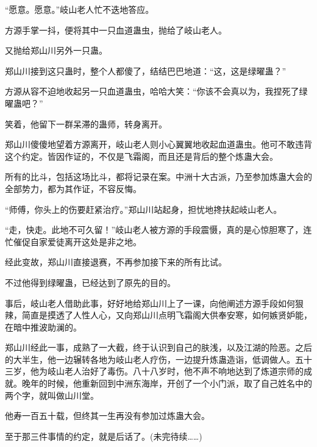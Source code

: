 \begin{this_body}
“愿意。愿意。”岐山老人忙不迭地答应。

方源手掌一抖，便将其中一只血道蛊虫，抛给了岐山老人。

又抛给郑山川另外一只蛊。

郑山川接到这只蛊时，整个人都傻了，结结巴巴地道：“这，这是绿曜蛊？”

方源从容不迫地收起另一只血道蛊虫，哈哈大笑：“你该不会真以为，我捏死了绿曜蛊吧？”

笑着，他留下一群呆滞的蛊师，转身离开。

郑山川傻傻地望着方源离开，岐山老人则小心翼翼地收起血道蛊虫。他可不敢违背这个约定。皆因作证的，不仅是飞霜阁，而且还是背后的整个炼蛊大会。

所有的比斗，包括这场比斗，都将记录在案。中洲十大古派，乃至参加炼蛊大会的全部势力，都为其作证，不容反悔。

“师傅，你头上的伤要赶紧治疗。”郑山川站起身，担忧地搀扶起岐山老人。

“走，快走。此地不可久留！”岐山老人被方源的手段震慑，真的是心惊胆寒了，连忙催促自家爱徒离开这处是非之地。

经此变故，郑山川直接退赛，不再参加接下来的所有比试。

不过他得到绿曜蛊，已经达到了原先的目的。

事后，岐山老人借助此事，好好地给郑山川上了一课，向他阐述方源手段如何狠辣，简直是摸透了人性人心，又向郑山川点明飞霜阁大供奉安寒，如何嫉贤妒能，在暗中推波助澜的。

郑山川经此一事，成熟了一大截，终于认识到自己的肤浅，以及江湖的险恶。之后的大半生，他一边辗转各地为岐山老人疗伤，一边提升炼蛊造诣，低调做人。五十三岁，他为岐山老人治好了毒伤。八十八岁时，他不声不响地达到了炼道宗师的成就。晚年的时候，他重新回到中洲东海岸，开创了一个小门派，取了自己姓名中的两个字，就叫做山川堂。

他寿一百五十载，但终其一生再没有参加过炼蛊大会。

至于那三件事情的约定，就是后话了。(未完待续……)

\end{this_body}

